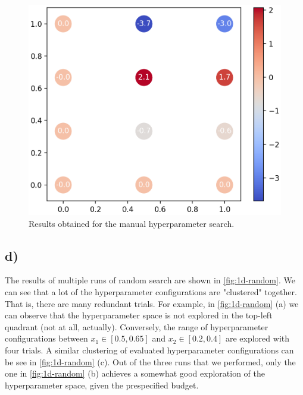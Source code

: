 \documentclass[11pt]{article}
\begin{document}
\begin{figure}[H]
  	\center
  	\includegraphics[width=.5\columnwidth]{assets/1c}
  	\caption{Results obtained for the manual hyperparameter search.}
  	\label{fig:1c}
\end{figure}

\subsection{d)}\label{subsec:basic-d}

The results of multiple runs of random search are shown in \autoref{fig:1d-random}. We can see that a lot of the hyperparameter configurations are "clustered" together. That is, there are many redundant trials. For example, in \autoref{fig:1d-random} (a) we can observe that the hyperparameter space is not explored in the top-left quadrant (not at all, actually). Conversely, the range of hyperparameter configurations between $x_1 \in [0.5, 0.65]$ and $x_2 \in [0.2, 0.4]$ are explored with four trials. A similar clustering of evaluated hyperparameter configurations can be see in \autoref{fig:1d-random} (c). Out of the three runs that we performed, only the one in \autoref{fig:1d-random} (b) achieves a somewhat good exploration of the hyperparameter space, given the prespecified budget.\\
\end{document}
